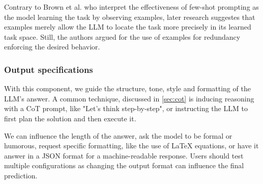 Contrary to Brown et al.\cite{brown2020languagemodelsfewshotlearners} who interpret the effectiveness of
few-shot prompting as the model learning the task by observing examples, later research\cite{reynolds2021promptprogramminglargelanguage}
suggestes that examples merely allow the LLM to locate the task more precisely in its learned task space.
Still, the authors argued for the use of examples for redundancy enforcing the desired behavior\cite{reynolds2021promptprogramminglargelanguage}.

\subsubsection{Output specifications}
With this component, we guide the structure, tone, style and formatting of the LLM's answer. 
A common technique, discussed in \ref{sec:cot} is inducing reasoning
with a CoT prompt, like "Let's think step-by-step", or instructing the LLM to 
first plan the solution and then execute it. 

We can influence the length of the answer, ask the model to be formal or humorous,
request specific formatting, like the use of \LaTeX{} equations, or have it answer in a JSON format
for a machine-readable response. Users should test multiple configurations as changing the output format
can influence the final prediction\cite{salinas2024butterflyeffectalteringprompts}.

